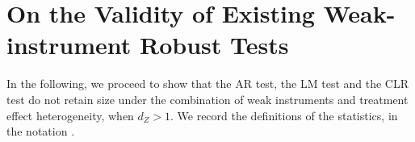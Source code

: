 \section{On the Validity of Existing Weak-instrument Robust Tests}

\label{sec:ar-clr}

In the following, we proceed to show that the \cite{andersonEstimationParametersSingle1949} AR test, the \cite{kleibergenGeneralizingWeakInstrument2007} LM test and the \cite{moreiraConditionalLikelihoodRatio2003} CLR test do not retain size under the combination of weak instruments and treatment effect heterogeneity, when \(d_Z>1\). We record the definitions of the statistics, in the notation \cite{finlayImplementingWeakInstrumentRobust2009}.
